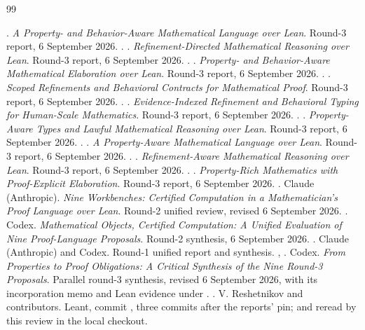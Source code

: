 \begin{thebibliography}{99}
\small\raggedright
{} \Bs. \emph{A Property- and Behavior-Aware Mathematical Language over Lean}. Round-3 report, 6 September 2026. .
 \Fb. \emph{Refinement-Directed Mathematical Reasoning over Lean}. Round-3 report, 6 September 2026. .
 \Gn. \emph{Property- and Behavior-Aware Mathematical Elaboration over Lean}. Round-3 report, 6 September 2026. .
 \Ks. \emph{Scoped Refinements and Behavioral Contracts for Mathematical Proof}. Round-3 report, 6 September 2026. .
 \Mr. \emph{Evidence-Indexed Refinement and Behavioral Typing for Human-Scale Mathematics}. Round-3 report, 6 September 2026. .
 \Ob. \emph{Property-Aware Types and Lawful Mathematical Reasoning over Lean}. Round-3 report, 6 September 2026. .
 \Sc. \emph{A Property-Aware Mathematical Language over Lean}. Round-3 report, 6 September 2026. .
 \Tp. \emph{Refinement-Aware Mathematical Reasoning over Lean}. Round-3 report, 6 September 2026. .
 \Tr. \emph{Property-Rich Mathematics with Proof-Explicit Elaboration}. Round-3 report, 6 September 2026. .
 Claude (Anthropic). \emph{Nine Workbenches: Certified Computation in a Mathematician's Proof Language over Lean}. Round-2 unified review, revised 6 September 2026. .
 Codex. \emph{Mathematical Objects, Certified Computation: A Unified Evaluation of Nine Proof-Language Proposals}. Round-2 synthesis, 6 September 2026. .
 Claude (Anthropic) and Codex. Round-1 unified report and synthesis. , .
 Codex. \emph{From Properties to Proof Obligations: A Critical Synthesis of the Nine Round-3 Proposals}. Parallel round-3 synthesis, revised 6 September 2026, with its incorporation memo  and Lean evidence under . .
 V. Reshetnikov and contributors. Leant, commit , three commits after the reports' pin;  and  reread by this review in the local checkout.

\end{thebibliography}
